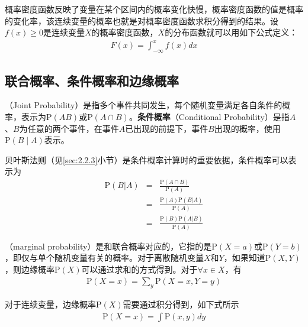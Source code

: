 \parinterval 概率密度函数反映了变量在某个区间内的概率变化快慢，概率密度函数的值是概率的变化率，该连续变量的概率也就是对概率密度函数求积分得到的结果。设$f(x) \geq 0$是连续变量$X$的概率密度函数，$X$的分布函数就可以用如下公式定义：
\begin{eqnarray}
F(x)=\int_{-\infty}^x f(x)dx
\label{eq:2-1}
\end{eqnarray}


\subsection{联合概率、条件概率和边缘概率}
（Joint Probability）是指多个事件共同发生，每个随机变量满足各自条件的概率，表示为$\textrm{P}(AB)$或$\textrm{P}(A\cap{B})$。{\small\sffamily\bfseries{条件概率}}（Conditional Probability）是指$A$、$B$为任意的两个事件，在事件$A$已出现的前提下，事件$B$出现的概率，使用$\textrm{P}(B \mid A)$表示。

\parinterval 贝叶斯法则（见\ref{sec:2.2.3}小节）是条件概率计算时的重要依据，条件概率可以表示为
\begin{eqnarray}
\textrm{P}{(B|A)} & = & \frac{\textrm{P}(A\cap{B})}{\textrm{P}(A)}  \nonumber \\
                           & = & \frac{\textrm{P}(A)\textrm{P}(B|A)}{\textrm{P}(A)}  \nonumber \\
                           & = & \frac{\textrm{P}(B)\textrm{P}(A|B)}{\textrm{P}(A)}
\label{eq:2-2}
\end{eqnarray}

（marginal probability）是和联合概率对应的，它指的是$\textrm{P}(X=a)$或$\textrm{P}(Y=b)$，即仅与单个随机变量有关的概率。对于离散随机变量$X$和$Y$，如果知道$\textrm{P}(X,Y)$，则边缘概率$\textrm{P}(X)$可以通过求和的方式得到。对于$\forall x \in X $，有
\begin{eqnarray}
\textrm{P}(X=x)=\sum_{y}  \textrm{P}(X=x,Y=y)
\label{eq:2-3}
\end{eqnarray}

\parinterval 对于连续变量，边缘概率$\textrm{P}(X)$需要通过积分得到，如下式所示
\begin{eqnarray}
\textrm{P}(X=x)=\int \textrm{P}(x,y)dy
\label{eq:2-4}
\end{eqnarray}

